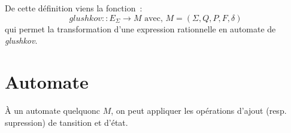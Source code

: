 \documentclass{article}
\begin{document}
De cette définition viens la fonction~:
\[
  glushkov :: E_{\Sigma} \to M \text{ avec, } M = (\Sigma, Q, P, F, \delta)
\]
qui permet la transformation d'une expression rationnelle en automate de 
\textit{glushkov}.


\section{Automate}

À un automate quelquonc \(M\), on peut appliquer les opérations d'ajout (resp. 
supression) de tansition et d'état.
\end{document}
